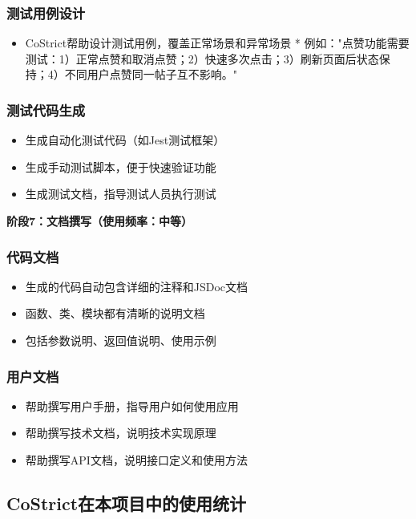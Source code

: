 ﻿\documentclass[12pt,a4paper]{article}
\begin{document}
\subsubsection{测试用例设计}
\begin{itemize}
    \item CoStrict帮助设计测试用例，覆盖正常场景和异常场景
    * 例如："点赞功能需要测试：1）正常点赞和取消点赞；2）快速多次点击；3）刷新页面后状态保持；4）不同用户点赞同一帖子互不影响。"
\end{itemize}

\subsubsection{测试代码生成}
\begin{itemize}
    \item 生成自动化测试代码（如Jest测试框架）
    \item 生成手动测试脚本，便于快速验证功能
    \item 生成测试文档，指导测试人员执行测试
\end{itemize}

\textbf{阶段7：文档撰写（使用频率：中等）}

\subsubsection{代码文档}
\begin{itemize}
    \item 生成的代码自动包含详细的注释和JSDoc文档
    \item 函数、类、模块都有清晰的说明文档
    \item 包括参数说明、返回值说明、使用示例
\end{itemize}

\subsubsection{用户文档}
\begin{itemize}
    \item 帮助撰写用户手册，指导用户如何使用应用
    \item 帮助撰写技术文档，说明技术实现原理
    \item 帮助撰写API文档，说明接口定义和使用方法
\end{itemize}

\subsection{CoStrict在本项目中的使用统计}
\end{document}
